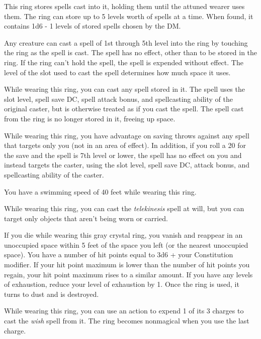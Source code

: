 \documentclass[10pt,a4paper,twoside,bg=print,twocolumn,openany,nodeprecatedcode]{dndbook}
\begin{document}
This ring stores spells cast into it, holding them until the attuned wearer uses them. The ring can store up to 5 levels worth of spells at a time. When found, it contains 1d6 - 1 levels of stored spells chosen by the DM.

Any creature can cast a spell of 1st through 5th level into the ring by touching the ring as the spell is cast. The spell has no effect, other than to be stored in the ring. If the ring can't hold the spell, the spell is expended without effect. The level of the slot used to cast the spell determines how much space it uses.

While wearing this ring, you can cast any spell stored in it. The spell uses the slot level, spell save DC, spell attack bonus, and spellcasting ability of the original caster, but is otherwise treated as if you cast the spell. The spell cast from the ring is no longer stored in it, freeing up space.

While wearing this ring, you have advantage on saving throws against any spell that targets only you (not in an area of effect). In addition, if you roll a 20 for the save and the spell is 7th level or lower, the spell has no effect on you and instead targets the caster, using the slot level, spell save DC, attack bonus, and spellcasting ability of the caster.

You have a swimming speed of 40 feet while wearing this ring.

While wearing this ring, you can cast the \textit{telekinesis} spell at will, but you can target only objects that aren't being worn or carried.

If you die while wearing this gray crystal ring, you vanish and reappear in an unoccupied space within 5 feet of the space you left (or the nearest unoccupied space). You have a number of hit points equal to 3d6 + your Constitution modifier. If your hit point maximum is lower than the number of hit points you regain, your hit point maximum rises to a similar amount. If you have any levels of exhaustion, reduce your level of exhaustion by 1. Once the ring is used, it turns to dust and is destroyed.

While wearing this ring, you can use an action to expend 1 of its 3 charges to cast the \textit{wish} spell from it. The ring becomes nonmagical when you use the last charge.
\end{document}
